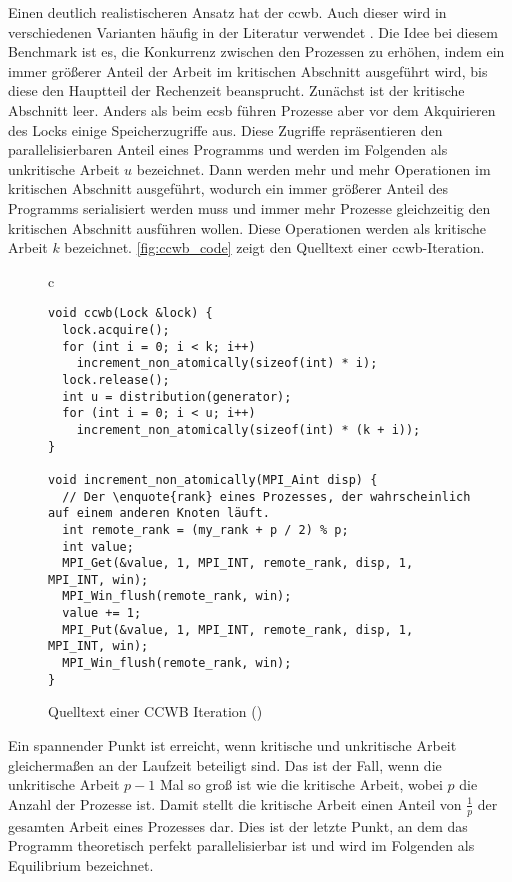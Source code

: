 Einen deutlich realistischeren Ansatz hat der \gls{ccwb}.
Auch dieser wird in verschiedenen Varianten häufig in der Literatur verwendet
\cite{RH-Lock} \cite{HCLH-Lock} \cite{FC-MCS-Lock} \cite{Cohort-Lock} \cite{RCL} \cite{HMCS-Lock} \cite{SANL}.
Die Idee bei diesem Benchmark ist es,
die \gls{Konkurrenz} zwischen den Prozessen zu erhöhen,
indem ein immer größerer Anteil der Arbeit im kritischen Abschnitt ausgeführt wird,
bis diese den Hauptteil der Rechenzeit beansprucht.
Zunächst ist der kritische Abschnitt leer.
Anders als beim \gls{ecsb} führen Prozesse aber vor dem Akquirieren des Locks einige Speicherzugriffe aus.
Diese Zugriffe repräsentieren den parallelisierbaren Anteil eines Programms
und werden im Folgenden als unkritische Arbeit $u$ bezeichnet.
Dann werden mehr und mehr Operationen im kritischen Abschnitt ausgeführt,
wodurch ein immer größerer Anteil des Programms serialisiert werden muss
und immer mehr Prozesse gleichzeitig den kritischen Abschnitt ausführen wollen.
Diese Operationen werden
als kritische Arbeit $k$ bezeichnet.
\autoref{fig:ccwb_code} zeigt den Quelltext einer \gls{ccwb}-Iteration.

\begin{figure}[h]
    \centering
    \begin{tabular}{c}\begin{lstlisting}
void ccwb(Lock &lock) {
  lock.acquire();
  for (int i = 0; i < k; i++)
    increment_non_atomically(sizeof(int) * i);
  lock.release();
  int u = distribution(generator);
  for (int i = 0; i < u; i++)
    increment_non_atomically(sizeof(int) * (k + i));
}

void increment_non_atomically(MPI_Aint disp) {
  // Der \enquote{rank} eines Prozesses, der wahrscheinlich auf einem anderen Knoten läuft.
  int remote_rank = (my_rank + p / 2) % p;
  int value;
  MPI_Get(&value, 1, MPI_INT, remote_rank, disp, 1, MPI_INT, win);
  MPI_Win_flush(remote_rank, win);
  value += 1;
  MPI_Put(&value, 1, MPI_INT, remote_rank, disp, 1, MPI_INT, win);
  MPI_Win_flush(remote_rank, win);
}
    \end{lstlisting}\end{tabular}
    \caption{Quelltext einer CCWB Iteration (\ccwburl)}
    \label{fig:ccwb_code}
\end{figure}

Ein spannender Punkt ist erreicht,
wenn kritische und unkritische Arbeit gleichermaßen an der Laufzeit beteiligt sind.
Das ist der Fall,
wenn die unkritische Arbeit $p - 1$ Mal so groß ist
wie die kritische Arbeit,
wobei $p$ die Anzahl der Prozesse ist.
Damit stellt die kritische Arbeit einen Anteil von $\frac{1}{p}$ der gesamten Arbeit eines Prozesses dar.
Dies ist der letzte Punkt,
an dem das Programm theoretisch perfekt parallelisierbar ist und wird im Folgenden als Equilibrium bezeichnet.

